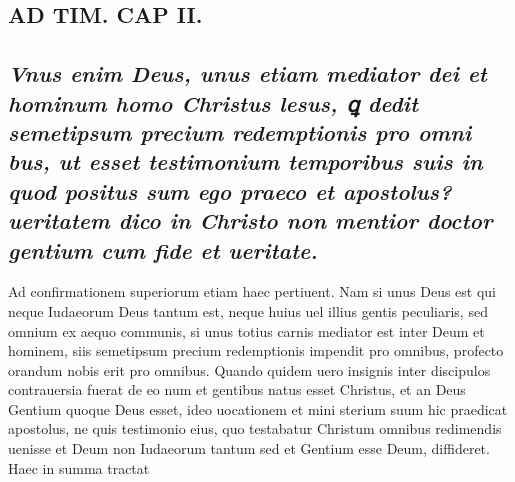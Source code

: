 \documentclass{article}
\begin{document}
\begin{pages}
\section*{AD TIM. CAP II. }
\marginpar{[ p.116 ]}
{}
\subsection*{\textit{Vnus enim Deus, unus etiam mediator dei et hominum homo Christus lesus, ꝗ dedit semetipsum precium redemptionis pro omni bus, ut esset testimonium temporibus suis in quod positus sum ego praeco et apostolus? ueritatem dico in Christo non mentior doctor gentium cum fide et ueritate. }}\pstart Ad confirmationem superiorum etiam haec pertiuent. Nam si unus Deus est qui neque Iudaeorum Deus tantum est, neque huius uel illius gentis peculiaris, sed omnium ex aequo communis, si unus totius carnis mediator est inter Deum et hominem, siis semetipsum precium redemptionis impendit pro omnibus, profecto orandum nobis erit pro omnibus. Quando quidem uero insignis inter discipulos contrauersia fuerat de eo num et gentibus natus esset Christus, et an Deus Gentium quoque Deus esset, ideo uocationem et mini sterium suum hic praedicat apostolus, ne quis testimonio eius, quo testabatur Christum omnibus redimendis uenisse et Deum non Iudaeorum tantum sed et Gentium esse Deum, diffideret. Haec in summa tractat  \pend

\end{pages}
\end{document}
